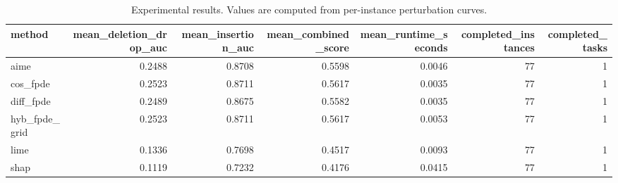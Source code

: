 \begin{table}[t]
\caption{Experimental results. Values are computed from per-instance perturbation curves.}
\label{tab:main_results_computed}
\centering
\begin{tabular}{lrrrrrr}
\toprule
method & mean\_deletion\_drop\_auc & mean\_insertion\_auc & mean\_combined\_score & mean\_runtime\_seconds & completed\_instances & completed\_tasks \\
\midrule
aime & 0.2488 & 0.8708 & 0.5598 & 0.0046 & 77 & 1 \\
cos\_fpde & 0.2523 & 0.8711 & 0.5617 & 0.0035 & 77 & 1 \\
diff\_fpde & 0.2489 & 0.8675 & 0.5582 & 0.0035 & 77 & 1 \\
hyb\_fpde\_grid & 0.2523 & 0.8711 & 0.5617 & 0.0053 & 77 & 1 \\
lime & 0.1336 & 0.7698 & 0.4517 & 0.0093 & 77 & 1 \\
shap & 0.1119 & 0.7232 & 0.4176 & 0.0415 & 77 & 1 \\
\bottomrule
\end{tabular}

\end{table}
